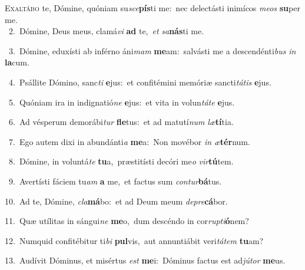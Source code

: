 \lettrine{\initial\textcolor{\initialcolor}{E}}{xaltábo} te, Dómine, quóniam su\-\textit{sce}\-\textbf{pís}ti me:~\star nec delectásti inimícos \textit{me}\-\textit{os} \textbf{su}\-per me.\\
{\numbfont\textcolor{\numbcolor}{~2.}}~Dómine, Deus meus, clamá\textit{vi} \textbf{ad} te,~\star \textit{et} \textit{sa}\-\textbf{nás}ti me.\par
{\numbfont\textcolor{\numbcolor}{~3.}}~Dómine, eduxísti ab inférno áni\textit{mam} \textbf{me}\-am:~\star salvásti me a descendénti\textit{bus} \textit{in} \textbf{la}\-cum.\par
{\numbfont\textcolor{\numbcolor}{~4.}}~Psállite Dómino, sanc\textit{ti} \textbf{e}\-jus:~\star et confitémini memóriæ sancti\-\textit{tá}\-\textit{tis} \textbf{e}\-jus.\par
{\numbfont\textcolor{\numbcolor}{~5.}}~Quóniam ira in indignatió\textit{ne} \textbf{e}\-jus:~\star et vita in volun\-\textit{tá}\-\textit{te} \textbf{e}\-jus.\par
{\numbfont\textcolor{\numbcolor}{~6.}}~Ad vésperum demorábi\textit{tur} \textbf{fle}\-tus:~\star et ad matutí\textit{num} \textit{læ}\-\textbf{tí}tia.\par
{\numbfont\textcolor{\numbcolor}{~7.}}~Ego autem dixi in abundánti\textit{a} \textbf{me}\-a:~\star Non movébor \textit{in} \textit{æ}\-\textbf{tér}num.\par
{\numbfont\textcolor{\numbcolor}{~8.}}~Dómine, in voluntá\textit{te} \textbf{tu}\-a,~\star præstitísti decóri me\textit{o} \textit{vir}\-\textbf{tú}tem.\par
{\numbfont\textcolor{\numbcolor}{~9.}}~Avertísti fáciem tu\textit{am} \textbf{a} me,~\star et factus sum \textit{con}\-\textit{tur}\textbf{bá}tus.\par
{\numbfont\textcolor{\numbcolor}{10.}}~Ad te, Dómine, \textit{cla}\-\textbf{má}bo:~\star et ad Deum meum \textit{de}\-\textit{pre}\textbf{cá}bor.\par
{\numbfont\textcolor{\numbcolor}{11.}}~Quæ utílitas in sángui\textit{ne} \textbf{me}\-o,~\star dum descéndo in cor\-\textit{rup}\-\textit{ti}\textbf{ó}nem?\par
{\numbfont\textcolor{\numbcolor}{12.}}~Numquid confitébitur ti\textit{bi} \textbf{pul}\-vis,~\star aut annuntiábit veri\-\textit{tá}\-\textit{tem} \textbf{tu}\-am?\par
{\numbfont\textcolor{\numbcolor}{13.}}~Audívit Dóminus, et misértus \textit{est} \textbf{me}\-i:~\star Dóminus factus est ad\-\textit{jú}\-\textit{tor} \textbf{me}\-us.\par
